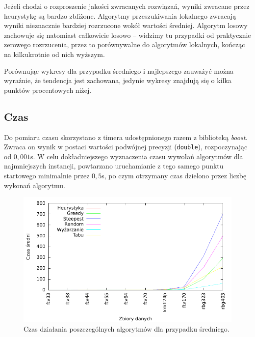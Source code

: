 Jeżeli chodzi o rozproszenie jakości zwracanych rozwiązań, wyniki zwracane przez heurystykę są bardzo zbliżone. Algorytmy przeszukiwania lokalnego zwracają wyniki nieznacznie bardziej rozrzucone wokół wartości średniej. Algorytm losowy zachowuje się natomiast całkowicie losowo -- widzimy tu przypadki od praktycznie zerowego rozrzucenia, przez to porównywalne do algorytmów lokalnych, kończąc na kilkukrotnie od nich wyższym.

Porównując wykresy dla przypadku średniego i najlepszego zauważyć można wyraźnie, że tendencja jest zachowana, jedynie wykresy znajdują się o kilka punktów procentowych niżej.

\subsection{Czas}
Do pomiaru czasu skorzystano z timera udostępnionego razem z biblioteką \emph{boost}. Zwraca on wynik w postaci wartości podwójnej precyzji (\texttt{double}), rozpoczynając od $0,001$s. W celu dokładniejszego wyznaczenia czasu wywołań algorytmów dla najmniejszych instancji, powtarzano uruchamianie z tego samego punktu startowego minimalnie przez $0,5$s, po czym otrzymany czas dzielono przez liczbę wykonań algorytmu.

\begin{figure}[!h]
\centering\includegraphics[width=12cm]{img/czas_avg}
\caption{Czas działania poszczególnych algorytmów dla przypadku średniego.}\label{rys:czas_avg}
\end{figure}

